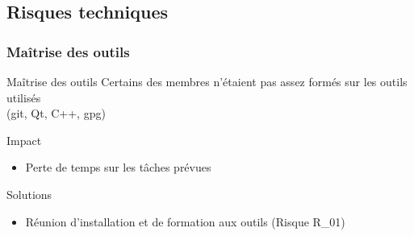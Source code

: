   \subsection{Risques techniques}
    \begin{frame}
      \frametitle{\color{white}Maîtrise des outils}
      \begin{block}{Maîtrise des outils}
        Certains des membres n'étaient pas assez formés sur les outils utilisés\\
        (git, Qt, C++, gpg)
      \end{block}

      \begin{exampleblock}{Impact}
        \begin{itemize}
          \item Perte de temps sur les tâches prévues
        \end{itemize}
      \end{exampleblock}
      
      \begin{exampleblock}{Solutions}
        \begin{itemize}
          \item Réunion d'installation et de formation aux outils (Risque R\_01)
        \end{itemize}
      \end{exampleblock}
    \end{frame}

